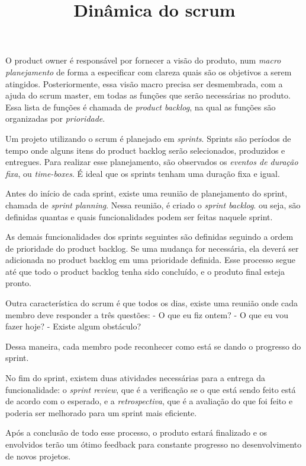 \documentclass[12pt]{article}
\begin{document}
\title{%
\large Dinâmica do scrum}\hfill \break

O product owner é responsável por fornecer a visão do produto, num \emph{macro planejamento} de forma a especificar com clareza quais são os objetivos a serem atingidos. Posteriormente, essa visão macro precisa ser desmembrada, com a ajuda do scrum master, em todas as funções que serão necessárias no produto. Essa lista de funções é chamada de \emph{product backlog}, na qual as funções são organizadas por \emph{prioridade}.\hfill \break

Um projeto utilizando o scrum é planejado em \emph{sprints}. Sprints são períodos de tempo onde alguns itens do product backlog serão selecionados, produzidos e entregues. Para realizar esse planejamento, são observados os \emph{eventos de duração fixa}, ou \emph{time-boxes}. É ideal que os sprints tenham uma duração fixa e igual.\hfill \break

Antes do início de cada sprint, existe uma reunião de planejamento do sprint, chamada de \emph{sprint planning}. Nessa reunião, é criado o \emph{sprint backlog}. ou seja, são definidas quantas e quais funcionalidades podem ser feitas naquele sprint.\hfill \break

As demais funcionalidades dos sprints seguintes são definidas seguindo a ordem de prioridade do product backlog. Se uma mudança for necessária, ela deverá ser adicionada no product backlog em uma prioridade definida. Esse processo segue até que todo o product backlog tenha sido concluído, e o produto final esteja pronto.\hfill \break

Outra característica do scrum é que todos os dias, existe uma reunião onde cada membro deve responder a três questões:\hfill \break
- O que eu fiz ontem?\hfill \break
- O que eu vou fazer hoje?\hfill \break
- Existe algum obstáculo?\hfill \break

Dessa maneira, cada membro pode reconhecer como está se dando o progresso do sprint.

No fim do sprint, existem duas atividades necessárias para a entrega da funcionalidade: o \emph{sprint review}, que é a verificação se o que está sendo feito está de acordo com o esperado, e a \emph{retrospectiva}, que é a avaliação do que foi feito e poderia ser melhorado para um sprint mais eficiente. \hfill \break

Após a conclusão de todo esse processo, o produto estará finalizado e os envolvidos terão um ótimo feedback para constante progresso no desenvolvimento de novos projetos.
\end{document}
